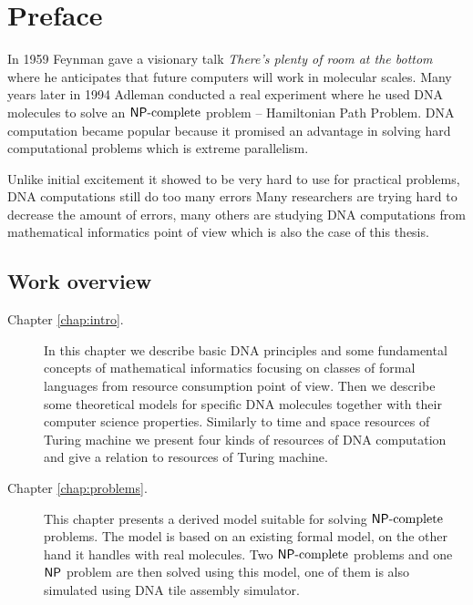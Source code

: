 \cleardoublepage{}   %
\chapter*{Preface}

In 1959 Feynman gave a visionary talk {\em There's plenty of room at the bottom} \cite{feynman} where he anticipates that future computers will work in molecular scales. Many years later in 1994 Adleman conducted a real experiment \cite{adleman94} where he used DNA molecules to solve an $\mathsf{NP}\textnormal{-complete}$ problem -- Hamiltonian Path Problem. DNA computation became popular because it promised an advantage in solving hard computational problems which is extreme parallelism.

Unlike initial excitement it showed to be very hard to use for practical problems, DNA computations still do too many errors %
Many researchers are trying hard to decrease the amount of errors, many others are studying DNA computations from mathematical informatics point of view which is also the case of this thesis.

\section*{Work overview}
	
	\begin{description}
		\item[Chapter \ref{chap:intro}.] In this chapter we describe basic DNA principles and some fundamental concepts of mathematical informatics focusing on classes of formal languages from resource consumption point of view. Then we describe some theoretical models for specific DNA molecules together with their computer science properties. Similarly to time and space resources of Turing machine we present four kinds of resources of DNA computation and give a relation to resources of Turing machine.
		\item[Chapter \ref{chap:problems}.] This chapter presents a derived model suitable for solving $\mathsf{NP}\textnormal{-complete}$ problems. The model is based on an existing formal model, on the other hand it handles with real molecules. Two $\mathsf{NP}\textnormal{-complete}$ problems and one $\mathsf{NP}$ problem are then solved using this model, one of them is also simulated using DNA tile assembly simulator.
	\end{description}

